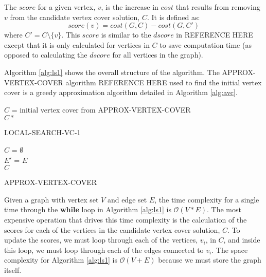\documentclass[sigconf]{acmart}
\newcommand{\bigo}[1]{\mathcal{O}(#1)}
\begin{document}
The $score$ for a given vertex, $v$, is the increase in $cost$ that results from removing $v$ from the candidate vertex cover solution, $C$. It is defined as:
\begin{equation*}
	score(v) = cost(G,C) - cost(G,C')
\end{equation*}
where $C' = C \setminus \{v\}$. This $score$ is similar to the $dscore$ in REFERENCE HERE except that it is only calculated for vertices in $C$ to save computation time (as opposed to calculating the $dscore$ for all vertices in the graph).

Algorithm \ref{alg:ls1} shows the overall structure of the algorithm. The APPROX-VERTEX-COVER algorithm REFERENCE HERE used to find the initial vertex cover is a greedy approximation algorithm detailed in Algorithm \ref{alg:avc}.

\begin{algorithm}[h]
	\SetAlgoNoLine
	$C$ = initial vertex cover from APPROX-VERTEX-COVER\\
	\Return $C*$
	\caption{LOCAL-SEARCH-VC-1}
	\label{alg:ls1}
\end{algorithm}

\begin{algorithm}[h]
	\SetAlgoNoLine
	$C$ = $\emptyset$\\
	$E'$ = $E$\\
	\Return $C$
	
	\caption{APPROX-VERTEX-COVER}
	\label{alg:avc}
\end{algorithm}

Given a graph with vertex set $V$ and edge set $E$, the time complexity for a single time through the \textbf{while} loop in Algorithm \ref{alg:ls1} is $\bigo{V * E}$. The most expensive operation that drives this time complexity is the calculation of the scores for each of the vertices in the candidate vertex cover solution, $C$. To update the scores, we must loop through each of the vertices, $v_i$, in $C$, and inside this loop, we must loop through each of the edges connected to $v_i$. The space complexity for Algorithm \ref{alg:ls1} is $\bigo{V + E}$ because we must store the graph itself.
\end{document}
